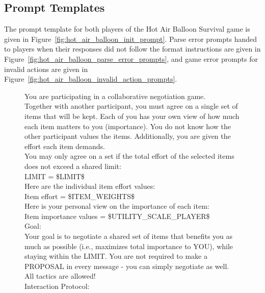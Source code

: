 \documentclass[../main.tex]{subfiles}
\begin{document}
\subsection{Prompt Templates}\label{sec:hot_air_balloon_appendix_prompt_templates}

The prompt template for both players of the Hot Air Balloon Survival game is given in Figure~\ref{fig:hot_air_balloon_init_prompt}. 
Parse error prompts handed to players when their responses did not follow the format instructions are given in Figure~\ref{fig:hot_air_balloon_parse_error_prompts}, and game error prompts for invalid actions are given in Figure~\ref{fig:hot_air_balloon_invalid_action_prompts}.

\begin{figure}
  \centering
  \begin{prompt}
You are participating in a collaborative negotiation game.\\

Together with another participant, you must agree on a single set of items that will be kept. Each of you has your own view of how much each item matters to you (importance). You do not know how the other participant values the items. Additionally, you are given the effort each item demands.\\
You may only agree on a set if the total effort of the selected items does not exceed a shared limit:\\

LIMIT = \$LIMIT\$\\

Here are the individual item effort values:\\

Item effort = \$ITEM\_WEIGHTS\$\\

Here is your personal view on the importance of each item:\\

Item importance values = \$UTILITY\_SCALE\_PLAYER\$\\

Goal:\\

Your goal is to negotiate a shared set of items that benefits you as much as possible (i.e., maximizes total importance to YOU), while staying within the LIMIT. You are not required to make a PROPOSAL in every message - you can simply negotiate as well. All tactics are allowed!\\

Interaction Protocol:\\


\end{prompt}
\end{figure}
\end{document}
